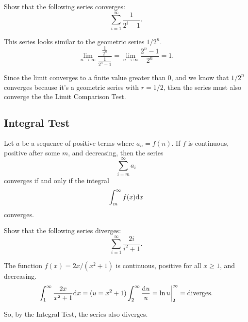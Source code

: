 \begin{example}
	Show that the following series converges:
	\begin{equation*}
		\sum_{i=1}^{\infty}{\frac{1}{2^i - 1}}.
	\end{equation*}
\end{example}
\begin{answer}
	This series looks similar to the geometric series $1/2^n$.
	\begin{equation*}
		\lim_{n\to\infty}{\frac{\frac{1}{2^n}}{\frac{1}{2^n-1}}} = \lim_{n\to\infty}{\frac{2^n - 1}{2^n}} = 1.
	\end{equation*}
	
	Since the limit converges to a finite value greater than 0, and we know that $1/2^n$ converges because it's a geometric series with $r=1/2$, then the series must also converge the the Limit Comparison Test.
\end{answer}

\subsection{Integral Test}
\begin{lemma}
	Let $a$ be a sequence of positive terms where $a_n = f(n)$.
	If $f$ is continuous, positive after some $m$, and decreasing, then the series
	\begin{equation*}
		\sum_{i=m}^{\infty}{a_i}
	\end{equation*}
	converges if and only if the integral
	\begin{equation*}
		\int_{m}^{\infty}{f(x)\mathrm{d} x}
	\end{equation*}
	converges.
\end{lemma}

\begin{example}
	Show that the following series diverges:
	\begin{equation*}
		\sum_{i=1}^{\infty}{\frac{2i}{i^2+1}}.
	\end{equation*}
\end{example}
\begin{answer}
	The function $f(x)=2x/(x^2+1)$ is continuous, positive for all $x \geq 1$, and decreasing.
	\begin{equation*}
		\int_{1}^{\infty}{\frac{2x}{x^2+1}\mathrm{d} x} = (u = x^2+1) \int_{2}^{\infty}{\frac{\mathrm{d} u}{u}} = \ln{u}\biggr\rvert_{2}^{\infty} = \text{diverges}.
	\end{equation*}
	
	So, by the Integral Test, the series also diverges.
\end{answer}

